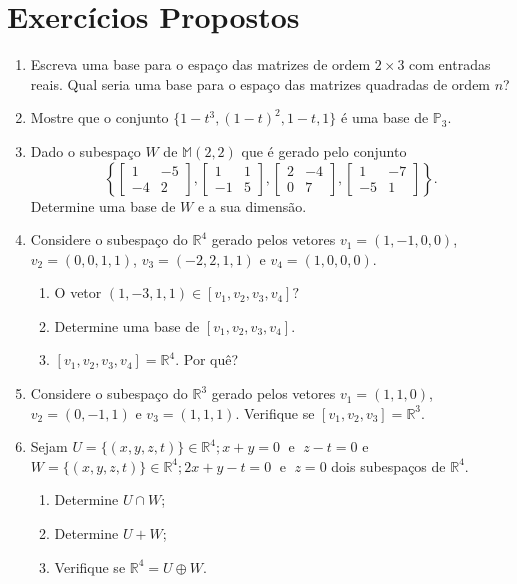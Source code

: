 \section{Exercícios Propostos}


\begin{enumerate}
\item Escreva uma base para o espaço das matrizes de ordem $2\times 3$ com entradas reais. Qual seria uma base para o espaço das matrizes quadradas de ordem $n$?

\item Mostre que o conjunto $\{ 1-t^3, (1-t)^2, 1-t , 1\}$ é uma base de $\mathbb{P}_3$.
\item Dado o subespaço $W$ de $\mathbb{M}(2,2)$ que é gerado pelo conjunto $$\left\{ \begin{bmatrix} 1 & -5 \\ -4 & 2\end{bmatrix}, \begin{bmatrix} 1 & 1\\ -1 & 5\end{bmatrix},\begin{bmatrix}2 & -4 \\ 0 & 7 \end{bmatrix},  \begin{bmatrix}1 & -7 \\-5 & 1 \end{bmatrix} \right\}.$$  Determine uma base de $W$ e a sua dimensão.

\item Considere o subespaço do $\mathbb{R}^4$ gerado pelos vetores $v_1=(1,-1,0,0)$, $v_2=(0,0,1,1)$, $v_3=(-2,2,1,1)$ e $v_4=(1,0,0,0)$.
\begin{enumerate}[label=(\alph*)]
\item 	O vetor $(1, -3,1, 1) \in [v_1, v_2, v_3, v_4]?$
\item Determine uma base de $[v_1, v_2, v_3, v_4]$.
\item  $[v_1, v_2, v_3, v_4]=\mathbb{R}^4$. Por quê?
\end{enumerate}

\item Considere o subespaço do $\mathbb{R}^3$ gerado pelos vetores $v_1=(1,1,0)$, $v_2=(0,-1,1)$ e $v_3=(1,1,1)$.  Verifique se $[v_1, v_2, v_3]=\mathbb{R}^3$.

\item Sejam $U= \{ (x, y, z, t) \} \in \mathbb{R}^4; x+y=0 \; \text{ e } \; z-t=0 $ e $W= \{ (x, y, z, t) \} \in \mathbb{R}^4; 2x+y-t=0 \; \text{ e } \; z=0 $ dois subespaços de $\mathbb{R}^4$.
\begin{enumerate}[label=(\alph*)]
\item 	Determine $ U \cap W$;
\item Determine $ U + W$;
\item Verifique se $\mathbb{R}^4 =U \oplus W$.
\end{enumerate}





\end{enumerate}
